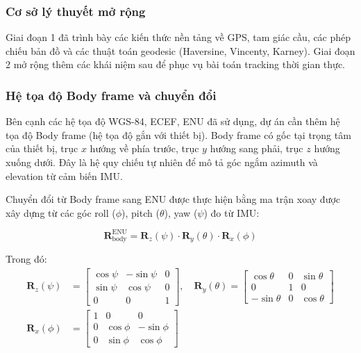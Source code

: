 \subsubsection{Cơ sở lý thuyết mở rộng}

\hspace{0.5cm} Giai đoạn 1 đã trình bày các kiến thức nền tảng về GPS, tam giác cầu, các phép chiếu bản đồ và các thuật toán geodesic (Haversine, Vincenty, Karney). Giai đoạn 2 mở rộng thêm các khái niệm sau để phục vụ bài toán tracking thời gian thực.

\subsubsection{Hệ tọa độ Body frame và chuyển đổi}

\hspace{0.5cm} Bên cạnh các hệ tọa độ WGS-84, ECEF, ENU đã sử dụng, dự án cần thêm hệ tọa độ Body frame (hệ tọa độ gắn với thiết bị). Body frame có gốc tại trọng tâm của thiết bị, trục $x$ hướng về phía trước, trục $y$ hướng sang phải, trục $z$ hướng xuống dưới. Đây là hệ quy chiếu tự nhiên để mô tả góc ngắm azimuth và elevation từ cảm biến IMU.

Chuyển đổi từ Body frame sang ENU được thực hiện bằng ma trận xoay được xây dựng từ các góc roll ($\phi$), pitch ($\theta$), yaw ($\psi$) đo từ IMU:

\begin{equation}
\mathbf{R}_{\text{body}}^{\text{ENU}} = \mathbf{R}_z(\psi) \cdot \mathbf{R}_y(\theta) \cdot \mathbf{R}_x(\phi)
\end{equation}

Trong đó:
\begin{align}
\mathbf{R}_z(\psi) &= \begin{bmatrix} \cos\psi & -\sin\psi & 0 \\ \sin\psi & \cos\psi & 0 \\ 0 & 0 & 1 \end{bmatrix}, \quad
\mathbf{R}_y(\theta) = \begin{bmatrix} \cos\theta & 0 & \sin\theta \\ 0 & 1 & 0 \\ -\sin\theta & 0 & \cos\theta \end{bmatrix} \\
\mathbf{R}_x(\phi) &= \begin{bmatrix} 1 & 0 & 0 \\ 0 & \cos\phi & -\sin\phi \\ 0 & \sin\phi & \cos\phi \end{bmatrix}
\end{align}


